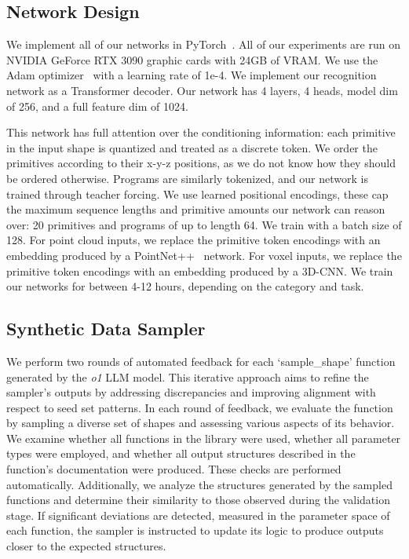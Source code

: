 \subsection{Network Design}

We implement all of our networks in PyTorch~\cite{paszke2017automatic}. 
All of our experiments are run on NVIDIA GeForce RTX 3090 graphic cards with 24GB of VRAM.
We use the Adam optimizer~\cite{Kingma2014AdamAM} with a learning rate of 1e-4.
We implement our recognition network as a Transformer decoder. 
Our network has 4 layers, 4 heads, model dim of 256, and a full feature dim of 1024.

This network has full attention over the conditioning information: each primitive in the input shape is quantized and treated as a discrete token.
We order the primitives according to their x-y-z positions, as we do not know how they should be ordered otherwise.
Programs are similarly tokenized, and our network is trained through teacher forcing. 
We use learned positional encodings, these cap the maximum sequence lengths and primitive amounts 
our network can reason over: 20 primitives and programs of up to length 64. 
We train with a batch size of 128.
For point cloud inputs, we replace the primitive token encodings with an embedding produced by a PointNet++~\cite{qi2017pointnet++} network. 
For voxel inputs, we replace the primitive token encodings with an embedding produced by a 3D-CNN. 
We train our networks for between 4-12 hours, depending on the category and task.

\subsection{Synthetic Data Sampler}

We perform two rounds of automated feedback for each `sample\_shape' function generated by the \textit{o1} LLM model.
This iterative approach aims to refine the sampler's outputs by addressing discrepancies and improving alignment with respect to seed set patterns. 
In each round of feedback, we evaluate the function by sampling a diverse set of shapes and assessing various aspects of its behavior. 
We examine whether all functions in the library were used, whether all parameter types were employed, and whether all output structures described in the function's documentation were produced. 
These checks are performed automatically.
Additionally, we analyze the structures generated by the sampled functions and determine their similarity to those observed during the validation stage. 
If significant deviations are detected, measured in the parameter space of each function, the sampler is instructed to update its logic to produce outputs closer to the expected structures.

